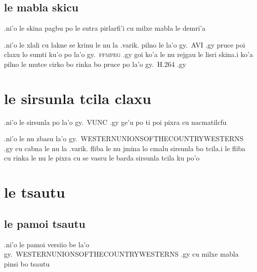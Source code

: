 \documentclass{report}
\begin{document}
\subsection{le mabla skicu}
.ni'o le skina pagbu po le sutra pirlarfi'i cu milxe mabla le demri'a

.ni'o le xlali cu lakne se krinu le nu la .varik. pilno le la'o gy.\ AVI .gy pruce poi claxu lo sumti ku'o po la'o gy.\ \textsc{ffmpeg} .gy goi ko'a le nu rejgau le lisri skina\@  .i ko'a pilno le mutce cirko bo rinka bo pruce po la'o gy.\ H.264 .gy

\section{le sirsunla tcila claxu}
.ni'o le sirsunla po la'o gy.\ VUNC .gy ge'u po ti poi pixra cu nacmatilcfu

.ni'o le nu zbasu la'o gy.\ WESTERNUNIONSOFTHECOUNTRYWESTERNS .gy cu cabna le nu la .varik. fliba le nu jmina lo cmalu sirsunla bo tcila\@  .i le fliba cu rinka le nu le pixra cu se vasru le barda sirsunla tcila ku po'o

\section{le tsautu}
\subsection{le pamoi tsautu}
.ni'o le pamoi versiio be la'o gy.\ WESTERNUNIONSOFTHECOUNTRYWESTERNS .gy cu milxe mabla pinsi bo tsautu
\end{document}
